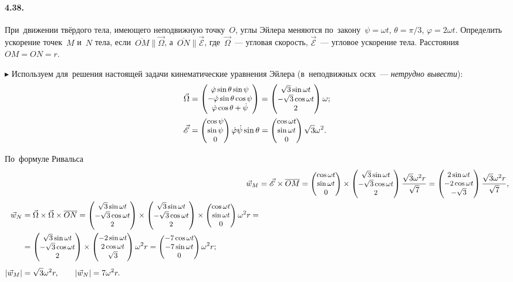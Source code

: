 \documentclass{weekly}
\begin{document}
\paragraph{4.38.} При~движении твёрдого тела, имеющего неподвижную
точку~$O$, углы Эйлера меняются по~закону~$\psi = \omega t$,
$\theta = \pi/3$, $\varphi = 2\omega t$. Определить ускорение
точек~$M$ и~$N$ тела, если~$\overline{OM} \parallel \vec\Omega$,
а~$\overline{ON} \parallel \vec{\mathscr{E}}$,
где~$\vec\Omega$~--- угловая скорость, $\vec{\mathscr{E}}$~--- угловое
ускорение тела. Расстояния $OM = ON = r$.

$\blacktriangleright$
Используем для~решения настоящей задачи кинематические уравнения Эйлера
(в~неподвижных осях~--- \emph{нетрудно вывести}):
\begin{align}
    \vec\Omega &= \small\begin{pmatrix}\dot\varphi\sin\theta\sin\psi\\-\dot\varphi\sin\theta\cos\psi\\\dot\varphi\cos\theta + \dot\psi\end{pmatrix}
        = \small\begin{pmatrix}\sqrt{3}\sin\omega t\\-\sqrt{3}\cos\omega t\\2\end{pmatrix} \omega; \\
    \vec{\mathscr{E}} &= \small\begin{pmatrix}\cos\psi\\\sin\psi\\0\end{pmatrix}
            \dot\varphi\dot\psi\sin\theta
        = \small\begin{pmatrix}\cos\omega t\\\sin\omega t\\0\end{pmatrix}
            \sqrt{3}\omega^2.
\end{align}

По~формуле Ривальса
\begin{align}
    \vec w_M &= \vec{\mathscr{E}} \times \overline{OM}
        = \small\begin{pmatrix}\cos\omega t\\\sin\omega t\\0\end{pmatrix} \times
            \small\begin{pmatrix}\sqrt{3}\sin\omega t\\-\sqrt{3}\cos\omega t\\2\end{pmatrix}
            \frac{\sqrt{3} \omega^2 r}{\sqrt{7}}
        = \small\begin{pmatrix}2\sin\omega t\\-2\cos\omega t\\-\sqrt{3}\end{pmatrix}
            \frac{\sqrt{3} \omega^2 r}{\sqrt{7}}, \\
\begin{split}
    \vec w_N &= \vec\Omega \times \vec\Omega \times \overline{ON}
        = \small\begin{pmatrix}\sqrt{3}\sin\omega t\\-\sqrt{3}\cos\omega t\\2\end{pmatrix} \times
            \small\begin{pmatrix}\sqrt{3}\sin\omega t\\-\sqrt{3}\cos\omega t\\2\end{pmatrix} \times
            \small\begin{pmatrix}\cos\omega t\\\sin\omega t\\0\end{pmatrix} \omega^2 r =\\
        &= \small\begin{pmatrix}\sqrt{3}\sin\omega t\\-\sqrt{3}\cos\omega t\\2\end{pmatrix} \times
            \small\begin{pmatrix}-2\sin\omega t\\2\cos\omega t\\\sqrt{3}\end{pmatrix} \omega^2 r
        = \small\begin{pmatrix}-7\cos\omega t\\-7\sin\omega t\\0\end{pmatrix} \omega^2 r; \\[1ex]
    \left| \vec w_M \right| &= \sqrt{3}\omega^2 r, \qquad
    \left| \vec w_N \right| = 7\omega^2 r.
\end{split}
\end{align}
\end{document}
